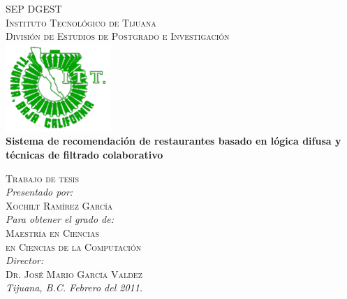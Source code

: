 \documentclass[12pt,letterpaper,oneside] {memoir}
\newcommand{\HRule}{\rule{\linewidth}{0.5mm}}
\begin{document}
	\thispagestyle{empty} 
\enlargethispage*{1000pt}
	\begin{center} 
	{ \textsc{\Large SEP } \hfill  \textsc{\Large DGEST}}\\[0.5cm]
	\textsc{\Large Instituto Tecnológico de Tijuana}\\[0.5cm]
	\textsc{\Large División de Estudios de Postgrado e Investigación }\\[1.0cm]
	\includegraphics[width=0.3\textwidth]{./logo}\\[0.5cm] %
	{ \LARGE \bfseries Sistema de recomendación de restaurantes basado en lógica difusa y técnicas de filtrado colaborativo}\\[1.5cm]
	\begin{minipage}{1.0\textwidth}
	\begin{flushright} 
	\textsc{ Trabajo de tesis}\\[0.5cm]
	\emph{Presentado por:} \\
	\textsc{ Xochilt Ramírez García}	\\
	\vspace{5 mm}
	\emph{Para obtener el grado de:} \\
	\textsc{Maestría en Ciencias  \\ en Ciencias de la Computación} \\
	\vspace{5 mm}
	\emph{Director:} \\
	\textsc{Dr. José Mario García Valdez} \\
	\vspace{5 mm}
	\emph{Tijuana, B.C. Febrero del 2011.}
	\end{flushright}
	\end{minipage}
	\vspace{13 mm}
	\vfill

	\end{center}
\clearpage
\thispagestyle{empty}
\end{document}
